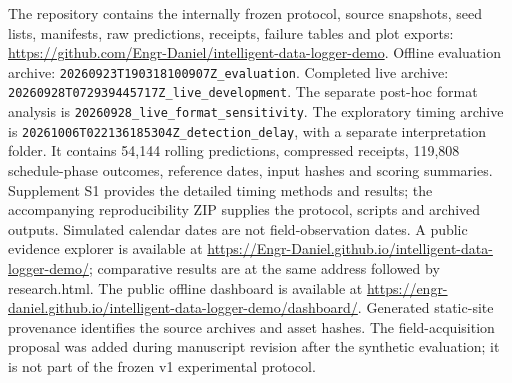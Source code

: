 \documentclass[11pt,a4paper]{article}
\begin{document}
The repository contains the internally frozen protocol, source snapshots, seed lists, manifests, raw predictions, receipts, failure tables and plot exports: \url{https://github.com/Engr-Daniel/intelligent-data-logger-demo}. Offline evaluation archive: \nolinkurl{20260923T190318100907Z_evaluation}. Completed live archive: \nolinkurl{20260928T072939445717Z_live_development}. The separate post-hoc format analysis is \nolinkurl{20260928_live_format_sensitivity}. The exploratory timing archive is \nolinkurl{20261006T022136185304Z_detection_delay}, with a separate interpretation folder. It contains 54,144 rolling predictions, compressed receipts, 119,808 schedule-phase outcomes, reference dates, input hashes and scoring summaries. Supplement S1 provides the detailed timing methods and results; the accompanying reproducibility ZIP supplies the protocol, scripts and archived outputs. Simulated calendar dates are not field-observation dates. A public evidence explorer is available at \url{https://Engr-Daniel.github.io/intelligent-data-logger-demo/}; comparative results are at the same address followed by research.html. The public offline dashboard is available at \url{https://engr-daniel.github.io/intelligent-data-logger-demo/dashboard/}. Generated static-site provenance identifies the source archives and asset hashes. The field-acquisition proposal was added during manuscript revision after the synthetic evaluation; it is not part of the frozen v1 experimental protocol.

\FloatBarrier


\end{document}
